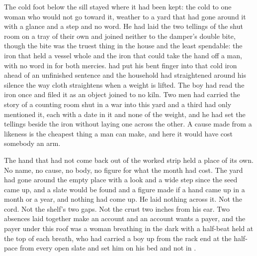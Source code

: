 The cold foot below the sill stayed where it had been kept: the cold to one woman who would not go toward it, weather to a yard that had gone around it with a glance and a step and no word. He had laid the two tellings of the shut room on a tray of their own and joined neither to the damper's double bite, though the bite was the truest thing in the house and the least spendable: the iron that held a vessel whole and the iron that could take the hand off a man, with no word in  for both mercies.  had put his bent finger into that cold iron ahead of an unfinished sentence and the household had straightened around his silence the way cloth straightens when a weight is lifted. The boy had read the iron once and filed it as an object joined to no kiln. Two men had carried the story of a counting room shut in a war into this yard and a third had only mentioned it, each with a date in it and none of the weight, and he had set the tellings beside the iron without laying one across the other. A cause made from a likeness is the cheapest thing a man can make, and here it would have cost somebody an arm.

The hand that had not come back out of the worked strip held a place of its own. No name, no cause, no body, no figure for what the month had cost. The yard had gone around the empty place with a look and a wide step since the seed came up, and a slate would be found and a figure made if a hand came up in a month or a year, and nothing had come up. He laid nothing across it. Not the cord. Not the shelf's two gaps. Not the crust two inches from his ear. Two absences laid together make an account and an account wants a payer, and the payer under this roof was a woman breathing in the dark with a half-beat held at the top of each breath, who had carried a boy up from the rack end at the half-pace from every open slate and set him on his bed and not in .

